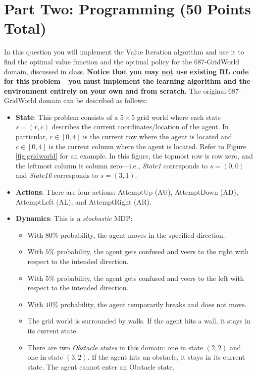 \documentclass{article}
\begin{document}
\newpage
\vspace{1cm}
\section*{Part Two: Programming (50 Points Total)}

In this question you will implement the Value Iteration algorithm and use it to find the optimal value function and the optimal policy for the 687-GridWorld domain, discussed in class. \textbf{Notice that you may \ul{not} use existing RL code for this problem---you must implement the learning algorithm and the environment entirely on your own and from scratch.} The original 687-GridWorld domain can be described as follows:

\begin{itemize}
    \item \textbf{State}: This problem consists of a $5 \times 5$ grid world where each state $s=(r,c)$ describes the current coordinates/location of the agent. In particular, $r \in [0,4]$ is the current row where the agent is located   and $c \in [0,4]$ is the current column where the agent is located. Refer to Figure \ref{fig:gridworld} for an example. In this figure, the topmost row is row zero, and the leftmost column is column zero---i.e., \textit{State1} corresponds to $s=(0,0)$ and \textit{State16} corresponds to $s=(3,1)$.
    \item \textbf{Actions}: There are four actions: AttemptUp (AU), AttemptDown (AD), AttemptLeft (AL), and AttemptRight (AR). 
    \item \textbf{Dynamics}: This is a  \emph{stochastic} MDP: 
    \begin{itemize}
        \item With $80\%$ probability, the agent moves in the specified direction.
        \item With $5\%$ probability, the agent gets confused and veers to the right with respect to the intended direction.
        \item With $5\%$ probability, the agent gets confused and veers to the left with respect to the intended direction.
        \item With $10\%$ probability, the agent temporarily breaks and does not move.
        \item The grid world is surrounded by walls. If the agent hits a wall, it stays in its current state. 
        \item There are two \textit{Obstacle states} in this domain: one in state $(2,2)$ and one in state $(3,2)$. If the agent hits an obstacle, it stays in its current state. The agent cannot enter an Obstacle state.

\end{itemize}
\end{itemize}
\end{document}
